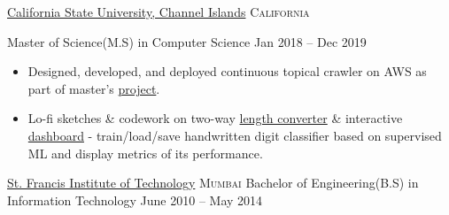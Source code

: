\documentclass[11pt,a4paper]{article}
\begin{document}
\headedsection
  {\href{https://www.csuci.edu/}{California State University, Channel Islands}}
  {\textsc{California}} {%
  \headedsubsection
    {Master of Science(M.S) in Computer Science}
    {Jan 2018 -- Dec 2019}
    {
      \begin{itemize}
        \item Designed, developed, and deployed continuous topical crawler on AWS as part of master's \href{https://github.com/rihbyne/csuci-mscs-thesis-dist-web-crawler/blob/master/initial-writeup/initialwriteup.pdf}{project}.
        \item Lo-fi sketches \& codework on two-way \href{https://github.com/rihbyne/linear-length-converter}{length converter} \&  interactive \href{https://github.com/rihbyne/watch-ml-behave}{dashboard} - train/load/save handwritten digit classifier based on supervised ML and display metrics of its performance.
      \end{itemize}
    }
  }

\headedsection
  {\href{http://www.mu.ac.in/}{St. Francis Institute of Technology}}
  {\textsc{Mumbai}} {%
  \headedsubsection
    {Bachelor of Engineering(B.S) in Information Technology}
    {June 2010 -- May 2014}
    {}
}
\end{document}
